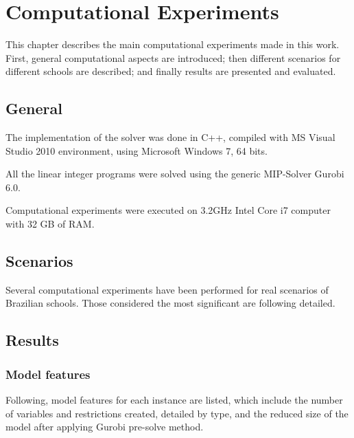 \chapter{Computational Experiments}
\label{chap:experiments}


This chapter describes the main computational experiments made in this work. First, general computational aspects are introduced; then different scenarios for different schools are described; and finally results are presented and evaluated.


\section{General}

The implementation of the solver was done in C++, compiled with MS Visual Studio 2010 environment, using Microsoft Windows 7, 64 bits.

All the linear integer programs were solved using the generic MIP-Solver Gurobi 6.0. 

Computational experiments were executed on 3.2GHz Intel Core i7 computer with 32 GB of RAM.


\section{Scenarios}

Several computational experiments have been performed for real scenarios of Brazilian schools. Those considered the most significant are following detailed.




\section{Results}

\subsection{Model features}

Following, model features for each instance are listed, which include the number of variables and restrictions created, detailed by type, and the reduced size of the model after applying Gurobi pre-solve method.



